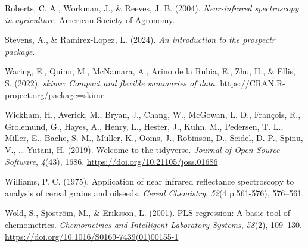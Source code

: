 \documentclass[
]{agujournal2019}
\newlength{\cslhangindent}
\newenvironment{CSLReferences}[2] %
 {\begin{list}{}{%
  \setlength{\itemindent}{0pt}
  \setlength{\leftmargin}{0pt}
  \setlength{\parsep}{0pt}
  \ifodd #1
   \setlength{\leftmargin}{\cslhangindent}
   \setlength{\itemindent}{-1\cslhangindent}
  \fi
  \setlength{\itemsep}{#2\baselineskip}}}
 {\end{list}}
\begin{document}
\begin{CSLReferences}{1}{0}
Roberts, C. A., Workman, J., \& Reeves, J. B. (2004).
\emph{Near-infrared spectroscopy in agriculture}. American Society of
Agronomy.

Stevens, A., \& Ramirez-Lopez, L. (2024). \emph{An introduction to the
prospectr package}.

Waring, E., Quinn, M., McNamara, A., Arino de la Rubia, E., Zhu, H., \&
Ellis, S. (2022). \emph{{skimr}: Compact and flexible summaries of
data}. \url{https://CRAN.R-project.org/package=skimr}

Wickham, H., Averick, M., Bryan, J., Chang, W., McGowan, L. D.,
François, R., Grolemund, G., Hayes, A., Henry, L., Hester, J., Kuhn, M.,
Pedersen, T. L., Miller, E., Bache, S. M., Müller, K., Ooms, J.,
Robinson, D., Seidel, D. P., Spinu, V., \ldots{} Yutani, H. (2019).
Welcome to the {tidyverse}. \emph{Journal of Open Source Software},
\emph{4}(43), 1686. \url{https://doi.org/10.21105/joss.01686}

Williams, P. C. (1975). Application of near infrared reflectance
spectroscopy to analysis of cereal grains and oilseeds. \emph{Cereal
Chemistry}, \emph{52}(4 p.561-576), 576--561.

Wold, S., Sjöström, M., \& Eriksson, L. (2001). {PLS}-regression: A
basic tool of chemometrics. \emph{Chemometrics and Intelligent
Laboratory Systems}, \emph{58}(2), 109--130.
\url{https://doi.org/10.1016/S0169-7439(01)00155-1}

\end{CSLReferences}
\end{document}
